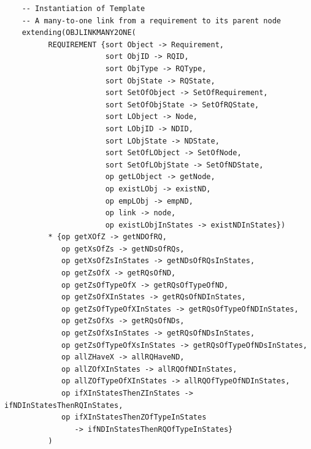 \documentclass[12pt]{report}
\begin{document}
\begin{verbatim}
    -- Instantiation of Template
    -- A many-to-one link from a requirement to its parent node
    extending(OBJLINKMANY2ONE(
          REQUIREMENT {sort Object -> Requirement,
                       sort ObjID -> RQID,
                       sort ObjType -> RQType,
                       sort ObjState -> RQState,
                       sort SetOfObject -> SetOfRequirement,
                       sort SetOfObjState -> SetOfRQState,
                       sort LObject -> Node,
                       sort LObjID -> NDID,
                       sort LObjState -> NDState,
                       sort SetOfLObject -> SetOfNode,
                       sort SetOfLObjState -> SetOfNDState,
                       op getLObject -> getNode,
                       op existLObj -> existND,
                       op empLObj -> empND,
                       op link -> node,
                       op existLObjInStates -> existNDInStates})
          * {op getXOfZ -> getNDOfRQ,
             op getXsOfZs -> getNDsOfRQs,
             op getXsOfZsInStates -> getNDsOfRQsInStates,
             op getZsOfX -> getRQsOfND,
             op getZsOfTypeOfX -> getRQsOfTypeOfND,
             op getZsOfXInStates -> getRQsOfNDInStates,
             op getZsOfTypeOfXInStates -> getRQsOfTypeOfNDInStates,
             op getZsOfXs -> getRQsOfNDs,
             op getZsOfXsInStates -> getRQsOfNDsInStates,
             op getZsOfTypeOfXsInStates -> getRQsOfTypeOfNDsInStates,
             op allZHaveX -> allRQHaveND,
             op allZOfXInStates -> allRQOfNDInStates,
             op allZOfTypeOfXInStates -> allRQOfTypeOfNDInStates,
             op ifXInStatesThenZInStates -> ifNDInStatesThenRQInStates,
             op ifXInStatesThenZOfTypeInStates
                -> ifNDInStatesThenRQOfTypeInStates}
          )
  

\end{verbatim}
\end{document}
